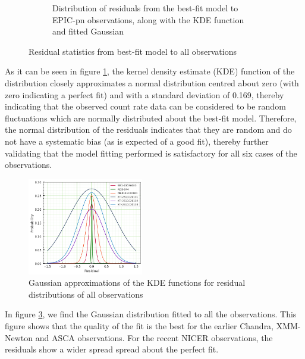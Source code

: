\begin{figure}[!htb]
\begin{subfigure}[b]{0.39\textwidth}
	        \caption{Distribution of residuals from the best-fit model to EPIC-pn observations, along with the KDE function and fitted Gaussian}
	        \label{fig:pn:resid-hist}
        \end{subfigure}
        \caption{Residual statistics from best-fit model to all observations}
        \label{fig:all-obs:resid-stats}
    \end{figure}
    
    As it can be seen in figure \ref{fig:pn:resid-hist}, the kernel density estimate (KDE) function of the distribution closely approximates a normal distribution centred about zero (with zero indicating a perfect fit) and with a standard deviation of 0.169, thereby indicating that the observed count rate data can be considered to be random fluctuations which are normally distributed about the best-fit model. Therefore, the normal distribution of the residuals indicates that they are random and do not have a systematic bias (as is expected of a good fit), thereby further validating that the model fitting performed is satisfactory for all six cases of the observations.
    
    \begin{figure}[!htb]
    	\centering
    	\includegraphics[width=0.45\textwidth]{figures/resid/mr-vel-resid-gaussfit_all-obs.png}
    	\caption{Gaussian approximations of the KDE functions for residual distributions of all observations}
    	\label{fig:all-obs:resid-gaussfit}
    \end{figure}
    
    In figure \ref{fig:all-obs:resid-gaussfit}, we find the Gaussian distribution fitted to all the observations. This figure shows that the quality of the fit is the best for the earlier Chandra, XMM-Newton and ASCA observations. For the recent NICER observations, the residuals show a wider spread spread about the perfect fit.
    
    

